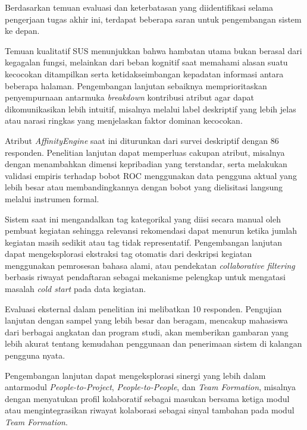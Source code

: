 Berdasarkan temuan evaluasi dan keterbatasan yang diidentifikasi selama pengerjaan tugas akhir ini, terdapat beberapa saran untuk pengembangan sistem ke depan.

Temuan kualitatif SUS menunjukkan bahwa hambatan utama bukan berasal dari kegagalan fungsi, melainkan dari beban kognitif saat memahami alasan suatu kecocokan ditampilkan serta ketidakseimbangan kepadatan informasi antara beberapa halaman. Pengembangan lanjutan sebaiknya memprioritaskan penyempurnaan antarmuka \emph{breakdown} kontribusi atribut agar dapat dikomunikasikan lebih intuitif, misalnya melalui label deskriptif yang lebih jelas atau narasi ringkas yang menjelaskan faktor dominan kecocokan.

Atribut \emph{AffinityEngine} saat ini diturunkan dari survei deskriptif dengan 86 responden. Penelitian lanjutan dapat memperluas cakupan atribut, misalnya dengan menambahkan dimensi kepribadian yang terstandar, serta melakukan validasi empiris terhadap bobot ROC menggunakan data pengguna aktual yang lebih besar atau membandingkannya dengan bobot yang dielisitasi langsung melalui instrumen formal.

Sistem saat ini mengandalkan tag kategorikal yang diisi secara manual oleh pembuat kegiatan sehingga relevansi rekomendasi dapat menurun ketika jumlah kegiatan masih sedikit atau tag tidak representatif. Pengembangan lanjutan dapat mengeksplorasi ekstraksi tag otomatis dari deskripsi kegiatan menggunakan pemrosesan bahasa alami, atau pendekatan \emph{collaborative filtering} berbasis riwayat pendaftaran sebagai mekanisme pelengkap untuk mengatasi masalah \emph{cold start} pada data kegiatan.

Evaluasi eksternal dalam penelitian ini melibatkan 10 responden. Pengujian lanjutan dengan sampel yang lebih besar dan beragam, mencakup mahasiswa dari berbagai angkatan dan program studi, akan memberikan gambaran yang lebih akurat tentang kemudahan penggunaan dan penerimaan sistem di kalangan pengguna nyata.

Pengembangan lanjutan dapat mengeksplorasi sinergi yang lebih dalam antarmodul \emph{People-to-Project}, \emph{People-to-People}, dan \emph{Team Formation}, misalnya dengan menyatukan profil kolaboratif sebagai masukan bersama ketiga modul atau mengintegrasikan riwayat kolaborasi sebagai sinyal tambahan pada modul \emph{Team Formation}.
